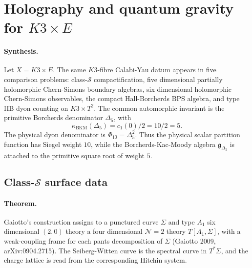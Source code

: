 \providecommand{\kchH}{\kappa_{\mathrm{ch}}^{\mathrm{Heis}}}
\providecommand{\kcat}{\kappa_{\mathrm{cat}}}
\providecommand{\kBKM}{\kappa_{\mathrm{BKM}}}
\providecommand{\kfib}{\kappa_{\mathrm{fiber}}}
\providecommand{\hCS}{\mathrm{hCS}}
\providecommand{\Obs}{\mathrm{Obs}}
\providecommand{\Yaff}{Y_{\epsilon_1,\epsilon_2,\epsilon_3}}
\providecommand{\gghone}{\widehat{\mathfrak{gl}}_1}
\providecommand{\gBKM}{\mathfrak{g}_{\Delta_5}}
\providecommand{\CoHA}{\mathrm{CoHA}}
\providecommand{\Phiten}{\Phi_{10}}
\providecommand{\C}{\mathbb{C}}
\providecommand{\R}{\mathbb{R}}
\providecommand{\cO}{\mathcal{O}}
\providecommand{\cN}{\mathcal{N}}
\providecommand{\cS}{\mathcal{S}}
\providecommand{\AdS}{\mathrm{AdS}}
\providecommand{\BTZ}{\mathrm{BTZ}}
\providecommand{\BH}{\mathrm{BH}}

\section*{Holography and quantum gravity for \(K3\times E\)}
\label{sec:holographic-qg-synthesis}

\paragraph{Synthesis.}
Let \(X=K3\times E\).  The same \(K3\)-fibre Calabi-Yau datum appears
in five comparison problems: class-\(\cS\) compactification, five
dimensional partially holomorphic Chern-Simons boundary algebras, six
dimensional holomorphic Chern-Simons observables, the compact
Hall-Borcherds BPS algebra, and type IIB dyon counting on
\(K3\times T^2\).  The common automorphic invariant is the primitive
Borcherds denominator \(\Delta_5\), with
\[
  \kBKM(\Delta_5)=c_1(0)/2=10/2=5.
\]
The physical dyon denominator is \(\Phiten=\Delta_5^2\).  Thus the
physical scalar partition function has Siegel weight \(10\), while the
Borcherds-Kac-Moody algebra \(\gBKM\) is attached to the primitive
square root of weight \(5\).

\subsection*{Class-\(\cS\) surface data}

\paragraph{Theorem.}
Gaiotto's construction assigns to a punctured curve \(\Sigma\) and type
\(A_1\) six dimensional \((2,0)\) theory a four dimensional
\(\cN=2\) theory \(T[A_1,\Sigma]\), with a weak-coupling frame for each
pants decomposition of \(\Sigma\) (Gaiotto 2009, arXiv:0904.2715).
The Seiberg-Witten curve is the spectral curve in \(T^\ast\Sigma\),
and the charge lattice is read from the corresponding Hitchin system.


